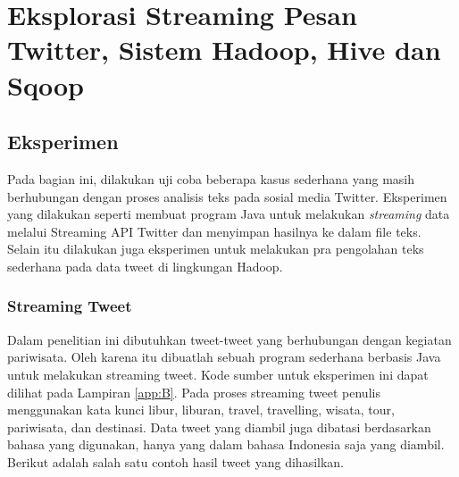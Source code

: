 \chapter{Eksplorasi Streaming Pesan Twitter, Sistem Hadoop, Hive dan Sqoop}

\section{Eksperimen}
Pada bagian ini, dilakukan uji coba beberapa kasus sederhana yang masih berhubungan dengan proses analisis teks pada sosial media Twitter. Eksperimen yang dilakukan seperti membuat program Java untuk melakukan \textit{streaming} data melalui Streaming API Twitter dan menyimpan hasilnya ke dalam file teks. Selain itu dilakukan juga eksperimen untuk melakukan pra pengolahan teks sederhana pada data tweet di lingkungan Hadoop.

\subsection{Streaming Tweet}
Dalam penelitian ini dibutuhkan tweet-tweet yang berhubungan dengan kegiatan pariwisata. Oleh karena itu dibuatlah sebuah program sederhana berbasis Java untuk melakukan streaming tweet. Kode sumber untuk eksperimen ini dapat dilihat pada Lampiran \ref{app:B}. Pada proses streaming tweet penulis menggunakan kata kunci libur, liburan, travel, travelling, wisata, tour, pariwisata, dan destinasi. Data tweet yang diambil juga dibatasi berdasarkan bahasa yang digunakan, hanya yang dalam bahasa Indonesia saja yang diambil. Berikut adalah salah satu contoh hasil tweet yang dihasilkan.

